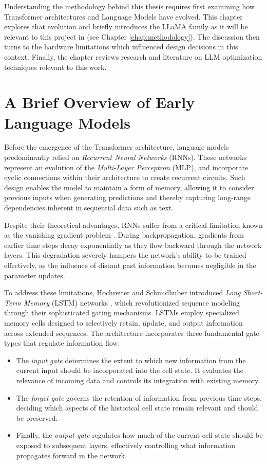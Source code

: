 Understanding the methodology behind this thesis requires first examining how Transformer architectures and Language Models have evolved. This chapter explores that evolution and briefly introduces the LLaMA family as it will be relevant to this project in (see Chapter \ref{chap:methodology}). The discussion then turns to the hardware limitations which influenced design decisions in this context. Finally, the chapter reviews research and literature on LLM optimization techniques relevant to this work.

\section{A Brief Overview of Early Language Models}
Before the emergence of the Transformer architecture, language models predominantly relied on \textit{Recurrent Neural Networks} (RNNs). These networks represent an evolution of the \textit{Multi-Layer Perceptron} (MLP), and incorporate cyclic connections within their architecture to create recurrent circuits. Such design enables the model to maintain a form of memory, allowing it to consider previous inputs when generating predictions and thereby capturing long-range dependencies inherent in sequential data such as text.

Despite their theoretical advantages, RNNs suffer from a critical limitation known as the vanishing gradient problem \cite{rnn}. During backpropagation, gradients from earlier time steps decay exponentially as they flow backward through the network layers. This degradation severely hampers the network's ability to be trained effectively, as the influence of distant past information becomes negligible in the parameter updates.

To address these limitations, Hochreiter and Schmidhuber introduced \textit{Long Short-Term Memory} (LSTM) networks \cite{lstm} \cite{hinton-lstm}, which revolutionized sequence modeling through their sophisticated gating mechanisms. LSTMs employ specialized memory cells designed to selectively retain, update, and output information across extended sequences.  The architecture incorporates three fundamental gate types that regulate information flow:
\begin{itemize}
    \item The \textit{input gate} determines the extent to which new information from the current input should be incorporated into the cell state. It evaluates the relevance of incoming data and controls its integration with existing memory.
    \item The \textit{forget gate} governs the retention of information from previous time steps, deciding which aspects of the historical cell state remain relevant and should be preserved.
    \item Finally, the \textit{output gate} regulates how much of the current cell state should be exposed to subsequent layers, effectively controlling what information propagates forward in the network.
\end{itemize}

